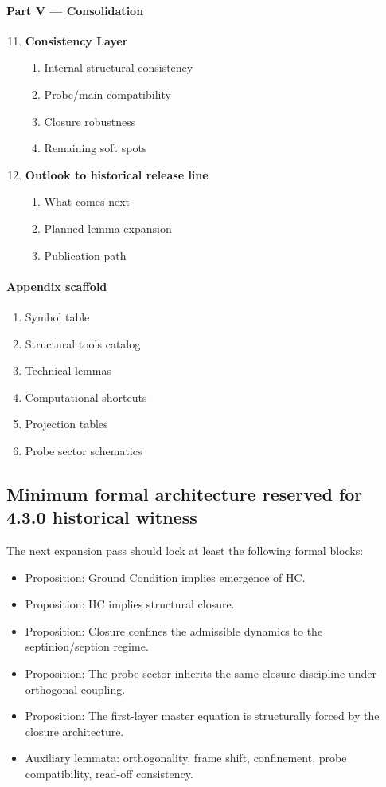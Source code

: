 \documentclass[12pt,a4paper]{article}
\DeclareRobustCommand{\QSCver}[1]{archival stage}
\newcommand{\docversion}{4.3.0 historical witness}
\renewcommand{\QSCver}[1]{historical release line}
\begin{document}
\paragraph{Part V --- Consolidation}
\begin{enumerate}[leftmargin=2em,label=\arabic*.]
 \setcounter{enumi}{10}
 \item \textbf{Consistency Layer}
 \begin{enumerate}[label*=\arabic*., leftmargin=2.5em]
 \item Internal structural consistency
 \item Probe/main compatibility
 \item Closure robustness
 \item Remaining soft spots
 \end{enumerate}
 \item \textbf{Outlook to \QSCver{v1.2.0}}
 \begin{enumerate}[label*=\arabic*., leftmargin=2.5em]
 \item What comes next
 \item Planned lemma expansion
 \item Publication path
 \end{enumerate}
\end{enumerate}

\paragraph{Appendix scaffold}
\begin{enumerate}[leftmargin=2em,label=\Alph*.]
 \item Symbol table
 \item Structural tools catalog
 \item Technical lemmas
 \item Computational shortcuts
 \item Projection tables
 \item Probe sector schematics
\end{enumerate}

\subsection*{Minimum formal architecture reserved for \docversion}
The next expansion pass should lock at least the following formal blocks:
\begin{itemize}[leftmargin=2em]
 \item Proposition: Ground Condition implies emergence of HC.
 \item Proposition: HC implies structural closure.
 \item Proposition: Closure confines the admissible dynamics to the septinion/seption regime.
 \item Proposition: The probe sector inherits the same closure discipline under orthogonal coupling.
 \item Proposition: The first-layer master equation is structurally forced by the closure architecture.
 \item Auxiliary lemmata: orthogonality, frame shift, confinement, probe compatibility, read-off consistency.
\end{itemize}
\end{document}
